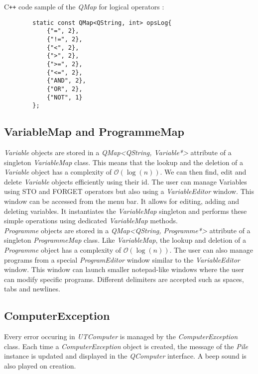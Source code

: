 \documentclass[titlepage]{article}
\begin{document}
    C\texttt{++} code sample of the \textit{QMap} for logical operators :
    \begin{lstlisting}
        static const QMap<QString, int> opsLog{
            {"=", 2},
            {"!=", 2},
            {"<", 2},
            {">", 2},
            {">=", 2},
            {"<=", 2},
            {"AND", 2},
            {"OR", 2},
            {"NOT", 1}
        };
    \end{lstlisting}

    \subsection{VariableMap and ProgrammeMap}

    \textit{Variable} objects are stored in a \textit{QMap<QString, Variable*>} attribute of a singleton \textit{VariableMap} class. This means that the lookup and the deletion of a \textit{Variable} object has a complexity of $\mathcal{O}(\log(n))$. We can then find, edit and delete \textit{Variable} objects efficiently using their id. The user can manage Variables using STO and FORGET operators but also using a \textit{VariableEditor} window. This window can be accessed from the menu bar. It allows for editing, adding and deleting variables. It instantiates the \textit{VariableMap} singleton and performs these simple operations using dedicated \textit{VariableMap} methods.\\
    \textit{Programme} objects are stored in a \textit{QMap<QString, Programme*>} attribute of a singleton \textit{ProgrammeMap} class. Like \textit{VariableMap}, the lookup and deletion of a \textit{Programme} object has a complexity of $\mathcal{O}(\log(n))$. The user can also manage programs from a special \textit{ProgramEditor} window similar to the \textit{VariableEditor} window. This window can launch smaller notepad-like windows where the user can modify specific programs. Different delimiters are accepted such as spaces, tabs and newlines. 

    \subsection{ComputerException}

    Every error occuring in \textit{UTComputer} is managed by the \textit{ComputerException} class. Each time a \textit{ComputerException} object is created, the message of the \textit{Pile} instance is updated and displayed in the \textit{QComputer} interface. A beep sound is also played on creation.
    
\end{document}
